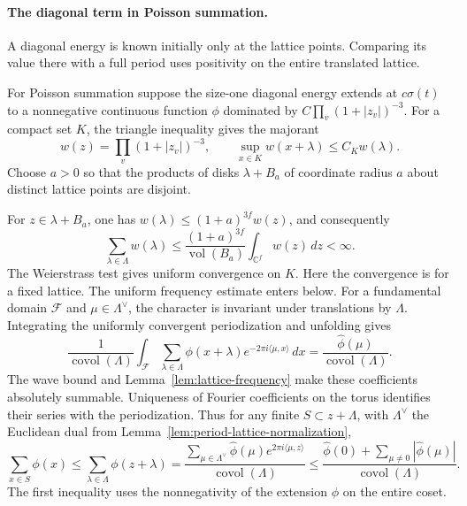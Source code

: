 \paragraph{The diagonal term in Poisson summation.}

A diagonal energy is known initially only at the lattice points. Comparing its value there with a full period uses positivity on the entire translated lattice.

For Poisson summation suppose the size-one diagonal energy
extends at \(c\sigma(t)\) to a nonnegative continuous function
\(\phi\) dominated by \(C\prod_v(1+|z_v|)^{-3}\). For a compact set \(K\), the triangle inequality gives the majorant
\[
 w(z)=\prod_v(1+|z_v|)^{-3},\qquad
 \sup_{x\in K}w(x+\lambda)\le C_K w(\lambda).
\] Choose \(a>0\) so that the products of disks \(\lambda+B_a\) of coordinate radius \(a\) about distinct lattice points are disjoint.

For \(z\in\lambda+B_a\), one has \(w(\lambda)\le(1+a)^{3f}w(z)\), and consequently
\[
 \sum_{\lambda\in\Lambda}w(\lambda)\le
 \frac{(1+a)^{3f}}{\operatorname{vol}(B_a)}
 \int_{\mathbb C^f}w(z)\,dz<\infty .
\]
The Weierstrass test gives uniform convergence on \(K\). Here the convergence is for a fixed lattice. The uniform frequency estimate enters below. For a fundamental domain \(\mathcal F\) and \(\mu\in\Lambda^\vee\),
the character is invariant under translations by \(\Lambda\).
Integrating the uniformly convergent periodization and unfolding gives
\[
 \frac1{\operatorname{covol}(\Lambda)}
 \int_{\mathcal F}\sum_{\lambda\in\Lambda}\phi(x+\lambda)
             e^{-2\pi i\langle\mu,x\rangle}\,dx
 =\frac{\widehat\phi(\mu)}{\operatorname{covol}(\Lambda)} .
\] The wave bound
and Lemma~\ref{lem:lattice-frequency} make these coefficients
absolutely summable. Uniqueness of Fourier coefficients on the
torus identifies their series with the periodization. Thus for any finite \(S\subset z+\Lambda\), with \(\Lambda^\vee\)
the Euclidean dual from Lemma~\ref{lem:period-lattice-normalization},
\[
 \sum_{x\in S}\phi(x)
 \le \sum_{\lambda\in\Lambda}\phi(z+\lambda)
 =\frac{\sum_{\mu\in\Lambda^\vee}
             \widehat\phi(\mu)e^{2\pi i\langle\mu,z\rangle}}
        {\operatorname{covol}(\Lambda)}
 \le \frac{\widehat\phi(0)+\sum_{\mu\ne0}|\widehat\phi(\mu)|}
          {\operatorname{covol}(\Lambda)} .
\]
The first inequality uses the nonnegativity of the extension
\(\phi\) on the entire coset.
 \label{cor:lattice-estimates-2}

